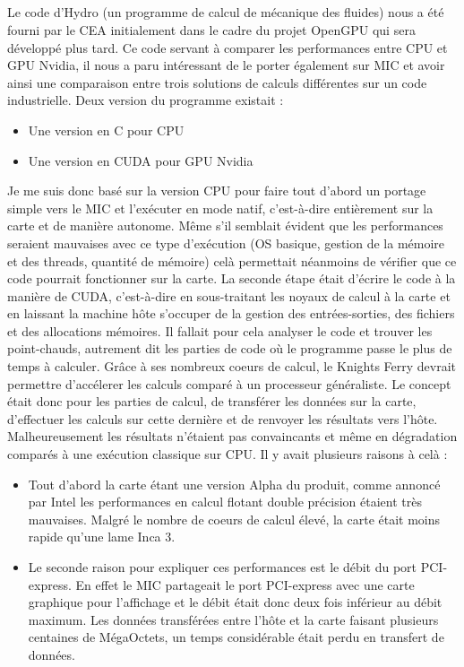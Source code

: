 \documentclass{article}
\begin{document}
					\subparagraph{}
					Le code d'Hydro (un programme de calcul de mécanique des fluides) nous a été fourni par le CEA initialement 
					dans le cadre du projet OpenGPU qui sera développé plus tard. Ce code servant à comparer les performances 
					entre CPU et GPU Nvidia, il nous a paru intéressant de le porter également sur MIC et avoir ainsi une 
					comparaison entre trois solutions de calculs différentes sur un code industrielle. \newline
					Deux version du programme existait : \newline
					\begin{itemize}
					\item Une version en C pour CPU
					\item Une version en CUDA pour GPU Nvidia \newline
					\end{itemize}
					Je me suis donc basé sur la version CPU pour faire tout d'abord un portage simple vers le MIC et l'exécuter 
					en mode natif, c'est-à-dire entièrement sur la carte et de manière autonome. Même s'il semblait évident 
					que les performances seraient mauvaises avec ce type d'exécution (OS basique, gestion de la mémoire et des 
					threads, quantité de mémoire) celà permettait néanmoins de vérifier que ce code pourrait fonctionner sur la 
					carte. \newline
					La seconde étape était d'écrire le code à la manière de CUDA, c'est-à-dire en sous-traitant les noyaux de 
					calcul à la carte et en laissant la machine hôte s'occuper de la gestion des entrées-sorties, des fichiers et 
					des allocations mémoires. Il fallait pour cela analyser le code et trouver les point-chauds, autrement dit 
					les parties de code où le programme passe le plus de temps à calculer. Grâce à ses nombreux coeurs de calcul, 
					le Knights Ferry devrait permettre d'accélerer les calculs comparé à un processeur généraliste. Le concept 
					était donc pour les parties de calcul, de transférer les données sur la carte, d'effectuer les calculs sur 
					cette dernière et de renvoyer les résultats vers l'hôte. Malheureusement les résultats n'étaient pas 
					convaincants et même en dégradation comparés à une exécution classique sur CPU. Il y avait plusieurs raisons 
					à celà : \newline
					\begin{itemize}
					\item Tout d'abord la carte étant une version Alpha du produit, comme annoncé par Intel les performances 
					en calcul flotant double précision étaient très mauvaises. Malgré le nombre de coeurs de calcul élevé, 
					la carte était moins rapide qu'une lame Inca 3.
					\item Le seconde raison pour expliquer ces performances est le débit du port PCI-express. En effet le MIC 
					partageait le port PCI-express avec une carte graphique pour l'affichage et le débit était donc deux fois 
					inférieur au débit maximum. Les données transférées entre l'hôte et la carte faisant plusieurs 
					centaines de MégaOctets, un temps considérable était perdu en transfert de données. \newline
					\end{itemize}
\end{document}
